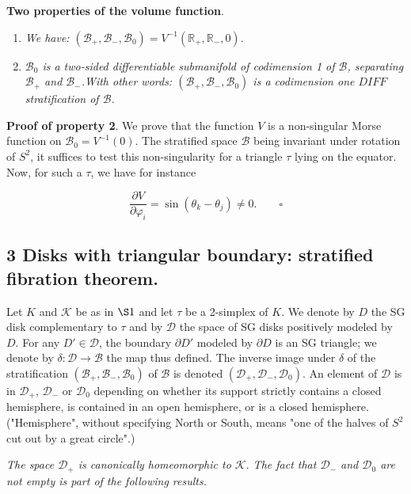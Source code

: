 \documentclass[12pt]{article}
\begin{document}
\noindent \textbf{Two properties of the volume function}.
\begin{enumerate}
\item \emph{We have: $(\mathcal{B}_+, \mathcal{B}_-, \mathcal{B}_0) = V^{-1}(\mathbb{R}_+,
\mathbb{R}_-, 0)$.}
\item \emph{$\mathcal{B}_0$ is a two-sided differentiable submanifold of codimension 1 of
$\mathcal{B}$, separating $\mathcal{B}_+$ and $\mathcal{B}_-$.With other words: $(\mathcal{B}_+, \mathcal{B}_-, \mathcal{B}_0)$ is a codimension one $DIFF$ stratification of  $\mathcal{B}$. }

\end{enumerate}

\noindent \textbf{Proof of property 2}. We prove that the function $V$ is a non-singular Morse
function on $\mathcal{B}_0 = V^{-1}(0)$. The stratified space $\mathcal{B}$ being invariant under
rotation of $S^2$, it suffices to test this non-singularity for a triangle $\tau$ lying on the equator.
Now, for such a $\tau$, we have for instance

\begin{equation*}
\frac{\partial V}{\partial \varphi_i} = \sin(\theta_k - \theta_j) \neq 0. \qquad \square
\end{equation*}

\subsection*{ 3 \textbf{Disks with triangular  boundary: stratified fibration theorem}.}

Let $K$ and $\mathcal{K}$ be as in $\S 1$
and let $\tau$ be a 2-simplex of $K$. We denote by $D$ the
SG disk complementary to $\tau$ and by $\mathcal{D}$ the space of SG disks positively modeled by
$D$.
For any $D' \in \mathcal{D}$, the boundary $\partial D'$ modeled by $\partial D$ is an SG triangle;
we denote by $\delta : \mathcal{D} \to \mathcal{B}$ the map thus defined. The inverse image under
$\delta$ of the stratification $(\mathcal{B}_+, \mathcal{B}_-, \mathcal{B}_0)$ of $\mathcal{B}$ is
denoted $(\mathcal{D}_+, \mathcal{D}_-, \mathcal{D}_0)$. 
An element of $\mathcal{D}$ is in $\mathcal{D}_+$, $\mathcal{D}_-$ or $\mathcal{D}_0$
depending on whether its support strictly contains a closed hemisphere, is contained in an open
hemisphere, or is a closed hemisphere.("Hemisphere", without specifying North or South, means
"one of the halves of $S^2$ cut out by a great circle".)

\emph{The space  $\mathcal{D}_+$ is canonically homeomorphic to $\mathcal{K}.$
 The fact that $\mathcal{D}_-$ and $\mathcal{D}_0$ are not empty is part of the following results.}
\end{document}
